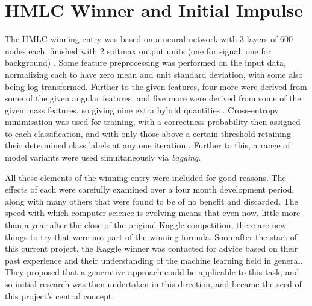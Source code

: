 \documentclass          {article} %
\begin{document}

               \section {HMLC Winner and Initial Impulse}
               \label   {sec:hmlc_winner_and_initial_impulse}


The HMLC winning entry was based on a neural network with 3 layers of 600 nodes each, finished with 2 softmax output units (one for signal, one for background) \cite{Melis2015}. Some feature preprocessing was performed on the input data, normalizing each to have zero mean and unit standard deviation, with some also being log-transformed. Further to the given features, four more were derived from some of the given angular features, and five more were derived from some of the given mass features, so giving nine extra hybrid quantities \cite{Melis2015}. Cross-entropy minimisation was used for training, with a correctness probability then assigned to each classification, and with only those above a certain threshold retaining their determined class labels at any one iteration \cite{Melis2015}. Further to this, a range of model variants were used simultaneously via \textit{bagging}.

All these elements of the winning entry were included for good reasons. The effects of each were carefully examined over a four month development period, along with many others that were found to be of no benefit and discarded. The speed with which computer science is evolving means that even now, little more than a year after the close of the original Kaggle competition, there are new things to try that were not part of the winning formula. Soon after the start of this current project, the Kaggle winner was contacted for advice based on their past experience and their understanding of the machine learning field in general. They proposed that a generative approach could be applicable to this task, and so initial research was then undertaken in this direction, and became the seed of this project's central concept.
\end{document}
